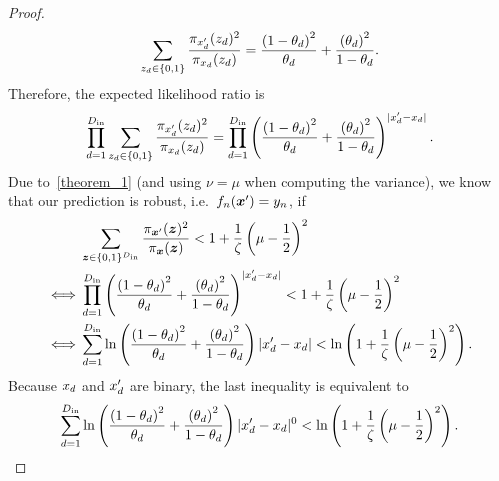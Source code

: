 \begin{proof}
\begin{equation}
    \sum_{{z}_d \in \{0,1\}}
     \frac{\pi_{{x}'_d}({z}_d)^2}{\pi_{{x}_d}({z}_d)} 
     = 
     \frac{\left(1 - {\theta}_d\right)^2}{{\theta}_d}
            + \frac{\left({\theta}_d\right)^2}{1 - {\theta}_d}.
\end{equation}
Therefore, the expected likelihood ratio is 
\begin{equation}
    \prod_{d=1}^{D_\mathrm{in}}
    \sum_{{z}_d \in \{0,1\}}
     \frac{\pi_{{x}'_d}({z}_d)^2}{\pi_{{x}_d}({z}_d)}
     = 
     \prod_{d=1}^{D_\mathrm{in}}
     \left(
     \frac{\left(1 - {\theta}_d\right)^2}{{\theta}_d}
            + \frac{\left({\theta}_d\right)^2}{1 - {\theta}_d}
     \right)^{|{x}'_d - {x}_d|}.
\end{equation}
Due to~\autoref{theorem_1} (and using $\nu = \mu$ when computing the variance), we know that our prediction is robust, i.e.~$f_n({\bm{x}}') = {y}_n$, if 
\begin{align}
    & \sum_{{\bm{z}} \in \{0,1\}^{D_\mathrm{in}}} \frac{\pi_{{\bm{x}}'}({\bm{z}})^2}{\pi_{{\bm{x}}}({\bm{z}})}
    <
     1 + \frac{1}{\zeta}\left(\mu - \frac{1}{2}\right)^2
     \\
    \iff
    &
    \prod_{d=1}^{D_\mathrm{in}}
     \left(
     \frac{\left(1 - {\theta}_d\right)^2}{{\theta}_d}
            + \frac{\left({\theta}_d\right)^2}{1 - {\theta}_d}
     \right)^{|{x}'_d - {x}_d|}
     <
     1 + \frac{1}{\zeta}\left(\mu - \frac{1}{2}\right)^2
     \\
     \iff
     &
     \sum_{d=1}^{D_\mathrm{in}}
     \ln \left(
     \frac{\left(1 - {\theta}_d\right)^2}{{\theta}_d}
            + \frac{\left({\theta}_d\right)^2}{1 - {\theta}_d}
     \right) {|{x}'_d - {x}_d|}
     < \ln\left(1 + \frac{1}{\zeta}\left(\mu - \frac{1}{2}\right)^2\right).
\end{align}
Because ${x}_d$ and ${x}'_d$ are binary, the last inequality is equivalent to
\begin{equation}
         \sum_{d=1}^{D_\mathrm{in}}
     \ln \left(
     \frac{\left(1 - {\theta}_d\right)^2}{{\theta}_d}
            + \frac{\left({\theta}_d\right)^2}{1 - {\theta}_d}
     \right) {|{x}'_d - {x}_d|^0}
     < \ln\left(1 + \frac{1}{\zeta}\left(\mu - \frac{1}{2}\right)^2\right).
\end{equation}
\end{proof}



